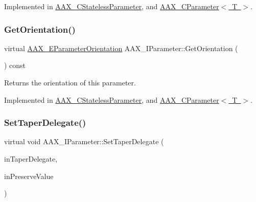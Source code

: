 Implemented in \mbox{\hyperlink{a01541_afa70e0faba000d1b6a241dfef7fd528c}{A\+A\+X\+\_\+\+C\+Stateless\+Parameter}}, and \mbox{\hyperlink{a01537_a99f0a049099f10a0b2e71329a3d75e9a}{A\+A\+X\+\_\+\+C\+Parameter$<$ T $>$}}.

\mbox{\label{a01857_a232110d283340a29aa33a4eff3bcca03}} 
\subsubsection{\texorpdfstring{GetOrientation()}{GetOrientation()}}
{\footnotesize\ttfamily virtual \mbox{\hyperlink{a00491_a52f91d1c14aa5dceedabfb9d2de31bf0}{A\+A\+X\+\_\+\+E\+Parameter\+Orientation}} A\+A\+X\+\_\+\+I\+Parameter\+::\+Get\+Orientation (\begin{DoxyParamCaption}{ }\end{DoxyParamCaption}) const\hspace{0.3cm}{\ttfamily [pure virtual]}}



Returns the orientation of this parameter. 



Implemented in \mbox{\hyperlink{a01541_a76283186d4844b0b9e6f37168415c93a}{A\+A\+X\+\_\+\+C\+Stateless\+Parameter}}, and \mbox{\hyperlink{a01537_a892d8a5a49ead3b3f922831a46744899}{A\+A\+X\+\_\+\+C\+Parameter$<$ T $>$}}.

\mbox{\label{a01857_a809a5c7f712ed2e5c55e30b6d5557c59}} 
\subsubsection{\texorpdfstring{SetTaperDelegate()}{SetTaperDelegate()}}
{\footnotesize\ttfamily virtual void A\+A\+X\+\_\+\+I\+Parameter\+::\+Set\+Taper\+Delegate (\begin{DoxyParamCaption}\item[{\mbox{\hyperlink{a01877}{A\+A\+X\+\_\+\+I\+Taper\+Delegate\+Base}} \&}]{in\+Taper\+Delegate,  }\item[{bool}]{in\+Preserve\+Value }\end{DoxyParamCaption})\hspace{0.3cm}{\ttfamily [pure virtual]}}




